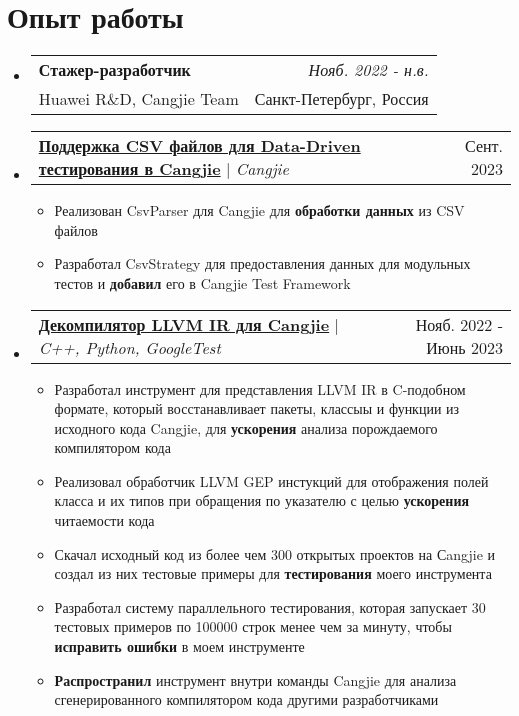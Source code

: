 \documentclass[english,russian,letterpaper,11pt]{article}
\makeatletter
\newcommand{\resumeItem}[1]{
  \item\small{
    {#1 \vspace{-2pt}}
  }
}
\newcommand{\resumeWorkExpHeading}[4]{
  \vspace{-2pt}\item
    \begin{tabular*}{0.97\textwidth}[t]{l@{\extracolsep{\fill}}r}
      \textbf{#1} & \textit{#2} \\
      #3 & #4 \\
    \end{tabular*}\vspace{-7pt}
}
\newcommand{\resumeProjectHeading}[2]{
    \item
    \begin{tabular*}{0.97\textwidth}{l@{\extracolsep{\fill}}r}
      \small#1 & #2 \\
    \end{tabular*}\vspace{-7pt}
}
\newcommand{\resumeSubHeadingListStart}{\begin{itemize}[leftmargin=0.15in, label={}]}
\newcommand{\resumeSubHeadingListEnd}{\end{itemize}}
\newcommand{\resumeItemListStart}{\begin{itemize}}
\newcommand{\resumeItemListEnd}{\end{itemize}\vspace{-5pt}}
\makeatother
\begin{document}
\section{Опыт работы}
    \resumeSubHeadingListStart
    \resumeWorkExpHeading
      {Стажер-разработчик}{Нояб. 2022 - н.в.}
      {Huawei R\&D, Cangjie Team}{Санкт-Петербург, Россия}
      \resumeProjectHeading
          {\underline{\textbf{Поддержка CSV файлов для Data-Driven тестирования в Cangjie}} $|$ \emph{Cangjie}}{Сент. 2023}
          \resumeItemListStart
            \resumeItem{Реализован CsvParser для Cangjie для \textbf{обработки данных} из CSV файлов}
            \resumeItem{Разработал CsvStrategy для предоставления данных для модульных тестов и \textbf{добавил} его в Cangjie Test Framework}
          \resumeItemListEnd
      \resumeProjectHeading
          {\underline{\textbf{Декомпилятор LLVM IR для Cangjie}} $|$ \emph{C++, Python, GoogleTest}}{Нояб. 2022 - Июнь 2023}
          \resumeItemListStart
            \resumeItem{Разработал инструмент для представления LLVM IR в C-подобном формате, который восстанавливает пакеты, классыы и функции из исходного кода Cangjie, для \textbf{ускорения} анализа порождаемого компилятором кода}
            \resumeItem{Реализовал обработчик LLVM GEP инстукций для отображения полей класса и их типов при обращения по указателю с целью \textbf{ускорения} читаемости кода}
            \resumeItem{Скачал исходный код из более чем 300 открытых проектов на Сangjie и создал из них тестовые примеры для \textbf{тестирования} моего инструмента}
            \resumeItem{Разработал систему параллельного тестирования, которая запускает 30 тестовых примеров по 100000 строк менее чем за минуту, чтобы \textbf{исправить ошибки} в моем инструменте}
            \resumeItem{\textbf{Распространил} инструмент внутри команды Cangjie для анализа сгенерированного компилятором кода другими разработчиками}
          \resumeItemListEnd
    \resumeSubHeadingListEnd

\end{document}
